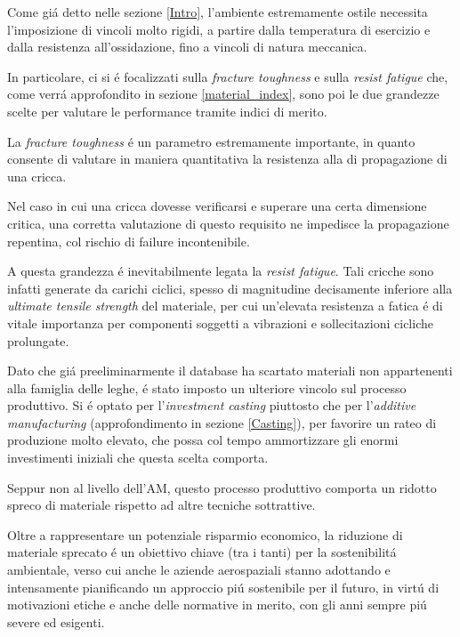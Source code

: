\documentclass{article}
\begin{document}
    Come giá detto nelle sezione \ref{Intro}, l'ambiente estremamente ostile necessita l'imposizione di vincoli molto 
    rigidi, a partire dalla temperatura di esercizio e dalla resistenza all'ossidazione, fino a vincoli di natura
    meccanica.

    In particolare, ci si é focalizzati sulla \textit{fracture toughness} e sulla \textit{resist fatigue} che, 
    come verrá approfondito in sezione \ref{material_index}, sono poi le due grandezze scelte per valutare le performance
    tramite indici di merito.

    La \textit{fracture toughness} é un parametro estremamente importante, in quanto consente di valutare in maniera quantitativa
    la resistenza alla di propagazione di una cricca. 
    
    Nel caso in cui una cricca dovesse verificarsi e superare una certa dimensione critica, una corretta valutazione
    di questo requisito ne impedisce la propagazione repentina, col rischio di failure incontenibile.

    A questa grandezza é inevitabilmente legata la \textit{resist fatigue}. Tali cricche sono infatti generate da carichi ciclici,
    spesso di magnitudine decisamente inferiore alla \textit{ultimate tensile strength} del materiale, per cui un'elevata
    resistenza a fatica é di vitale importanza per componenti soggetti a vibrazioni e sollecitazioni cicliche prolungate.

    Dato che giá preeliminarmente il database ha scartato materiali non appartenenti alla famiglia delle leghe, é stato imposto
    un ulteriore vincolo sul processo produttivo. Si é optato per l'\textit{investment casting} piuttosto che per 
    l'\textit{additive manufacturing} (approfondimento in sezione \ref{Casting}), per favorire un rateo di produzione molto elevato, che possa col tempo ammortizzare
    gli enormi investimenti iniziali che questa scelta comporta.

    Seppur non al livello dell'AM, questo processo produttivo comporta un ridotto spreco di materiale
    rispetto ad altre tecniche sottrattive. 

    Oltre a rappresentare un potenziale risparmio economico, la riduzione di materiale sprecato é un obiettivo
    chiave (tra i tanti) per la sostenibilitá ambientale, verso cui anche le aziende aerospaziali stanno 
    adottando e intensamente pianificando un approccio piú sostenibile per il futuro, in virtú di motivazioni etiche
    e anche delle normative in merito, con gli anni sempre piú severe ed esigenti.
\end{document}
